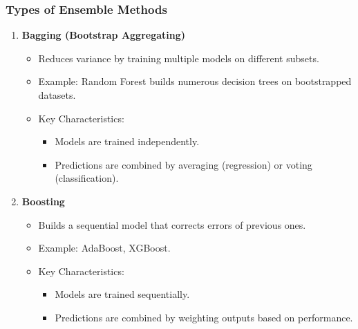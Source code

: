 \documentclass[aspectratio=169]{beamer}
\begin{document}
\begin{frame}[fragile]
    \frametitle{Types of Ensemble Methods}
    \begin{enumerate}
        \item \textbf{Bagging (Bootstrap Aggregating)}
        \begin{itemize}
            \item Reduces variance by training multiple models on different subsets.
            \item Example: Random Forest builds numerous decision trees on bootstrapped datasets.
            \item Key Characteristics:
                \begin{itemize}
                    \item Models are trained independently.
                    \item Predictions are combined by averaging (regression) or voting (classification).
                \end{itemize}
        \end{itemize}
        
        \item \textbf{Boosting}
        \begin{itemize}
            \item Builds a sequential model that corrects errors of previous ones.
            \item Example: AdaBoost, XGBoost.
            \item Key Characteristics:
                \begin{itemize}
                    \item Models are trained sequentially.
                    \item Predictions are combined by weighting outputs based on performance.
                \end{itemize}
        \end{itemize}
    \end{enumerate}
\end{frame}
\end{document}
